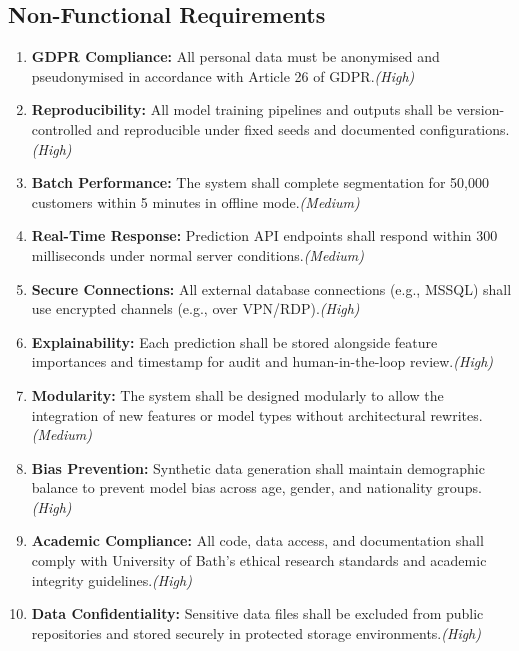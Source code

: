 \documentclass[12pt,a4paper]{report}
\begin{document}
\subsection{Non-Functional Requirements}

\begin{enumerate}[label=NFR\arabic*:]
  \item \textbf{GDPR Compliance:} All personal data must be anonymised and pseudonymised in accordance with Article 26 of GDPR.\hfill \textit{(High)}
  
  \item \textbf{Reproducibility:} All model training pipelines and outputs shall be version-controlled and reproducible under fixed seeds and documented configurations.\hfill \textit{(High)}
  
  \item \textbf{Batch Performance:} The system shall complete segmentation for 50,000 customers within 5 minutes in offline mode.\hfill \textit{(Medium)}
  
  \item \textbf{Real-Time Response:} Prediction API endpoints shall respond within 300 milliseconds under normal server conditions.\hfill \textit{(Medium)}
  
  \item \textbf{Secure Connections:} All external database connections (e.g., MSSQL) shall use encrypted channels (e.g., over VPN/RDP).\hfill \textit{(High)}
  
  \item \textbf{Explainability:} Each prediction shall be stored alongside feature importances and timestamp for audit and human-in-the-loop review.\hfill \textit{(High)}
  
  \item \textbf{Modularity:} The system shall be designed modularly to allow the integration of new features or model types without architectural rewrites.\hfill \textit{(Medium)}
  
  \item \textbf{Bias Prevention:} Synthetic data generation shall maintain demographic balance to prevent model bias across age, gender, and nationality groups.\hfill \textit{(High)}
  
  \item \textbf{Academic Compliance:} All code, data access, and documentation shall comply with University of Bath’s ethical research standards and academic integrity guidelines.\hfill \textit{(High)}
  
  \item \textbf{Data Confidentiality:} Sensitive data files shall be excluded from public repositories and stored securely in protected storage environments.\hfill \textit{(High)}
\end{enumerate}
\end{document}
